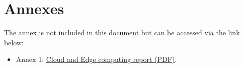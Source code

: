 \documentclass[a4paper, 14.49998pt]{report}
\begin{document}
\renewcommand\contentsname{Table of contents}
\tableofcontents
\newpage










\newpage
\section{Annexes}
The annex is not included in this document but can be accessed via the link below:
\begin{itemize}
    \item Annex 1: \href{annexe/BIENDOU-BRUNETTO-VASSEUR-Cloud_Computing_Report.pdf}{Cloud and Edge computing report  (PDF)}.
\end{itemize}
\end{document}
